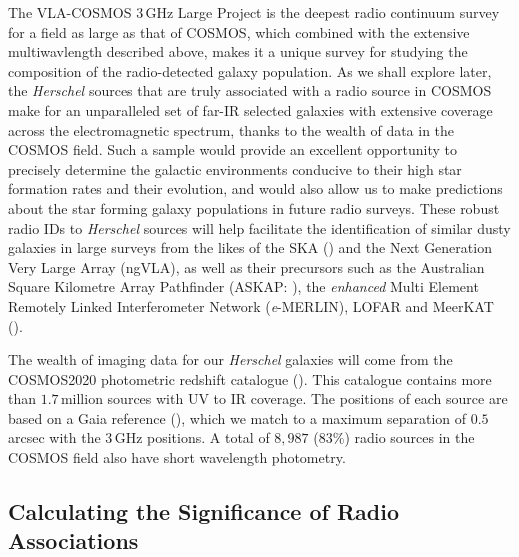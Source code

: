 The VLA-COSMOS $3\,$GHz Large Project is the deepest radio continuum survey for a field as large as that of COSMOS, which combined with the extensive multiwavlength described above, makes it a unique survey for studying the composition of the radio-detected galaxy population. As we shall explore later, the \textit{Herschel} sources that are truly associated with a radio source in COSMOS make for an unparalleled set of far-IR selected galaxies with extensive coverage across the electromagnetic spectrum, thanks to the wealth of data in the COSMOS field. Such a sample would provide an excellent opportunity to precisely determine the galactic environments conducive to their high star formation rates and their evolution, and would also allow us to make predictions about the star forming galaxy populations in future radio surveys. These robust radio IDs to \textit{Herschel} sources will help facilitate the identification of similar dusty galaxies in large surveys from the likes of the SKA (\citealt{Dewdney_2009}) and the Next Generation Very Large Array (ngVLA), as well as their precursors such as the Australian Square Kilometre Array Pathfinder (ASKAP: \citealt{Johnston_2007}), the \textit{enhanced} Multi Element Remotely Linked Interferometer Network (\textit{e}-MERLIN), LOFAR and MeerKAT (\citealt{Jonas_2009}).

The wealth of imaging data for our \textit{Herschel} galaxies will come from the COSMOS2020 photometric redshift catalogue (\citealt{Weaver_2022}). This catalogue contains more than $1.7\,$million sources with UV to IR coverage. The positions of each source are based on a Gaia reference (\citealt{Gaia_2016}), which we match to a maximum separation of $0.5\,$arcsec with the $3\,$GHz positions. A total of $8,987$ ($83\%$) radio sources in the COSMOS field also have short wavelength photometry.

\subsection{Calculating the Significance of Radio Associations}
\label{sec:radio_significance}

